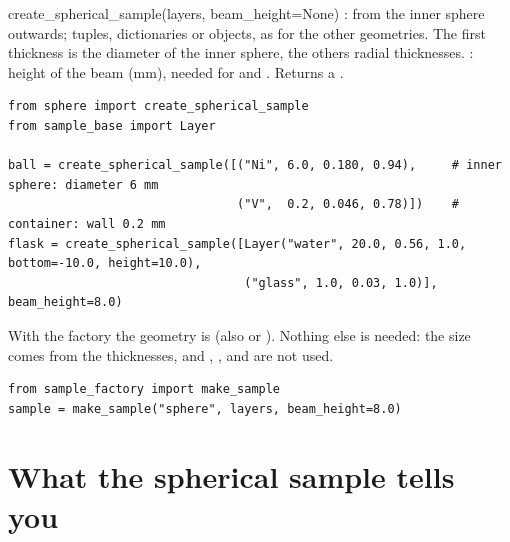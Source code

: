 \begin{fnbox}{create\_spherical\_sample(layers, beam\_height=None)}
: from the inner sphere outwards; tuples, dictionaries or  objects, as for the other geometries. The first
thickness is the diameter of the inner sphere, the others radial thicknesses. : height of the beam (mm), needed for
 and . Returns a .
\end{fnbox}

\begin{lstlisting}
from sphere import create_spherical_sample
from sample_base import Layer

ball = create_spherical_sample([("Ni", 6.0, 0.180, 0.94),     # inner sphere: diameter 6 mm
                                ("V",  0.2, 0.046, 0.78)])    # container: wall 0.2 mm
flask = create_spherical_sample([Layer("water", 20.0, 0.56, 1.0, bottom=-10.0, height=10.0),
                                 ("glass", 1.0, 0.03, 1.0)], beam_height=8.0)
\end{lstlisting}
With the factory the geometry is  (also  or ). Nothing else is needed: the size comes from
the thicknesses, and , ,  and  are not used.
\begin{lstlisting}
from sample_factory import make_sample
sample = make_sample("sphere", layers, beam_height=8.0)
\end{lstlisting}

\section{What the spherical sample tells you}

